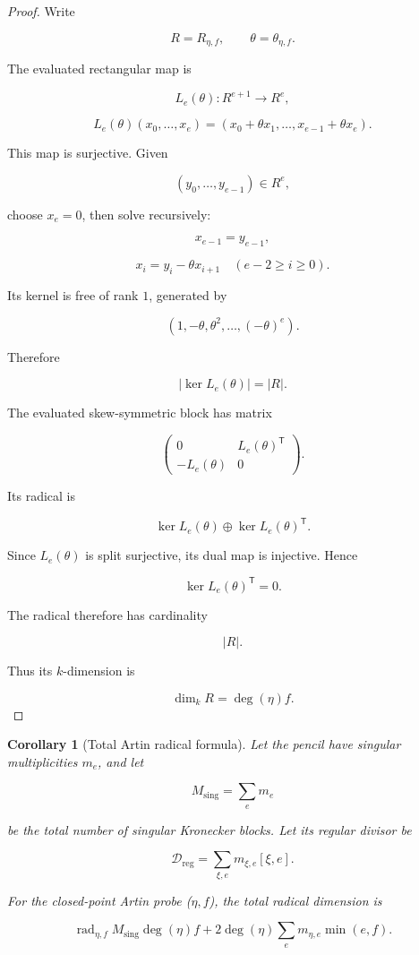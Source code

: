 \documentclass[11pt]{article}
\newtheorem{corollary}[theorem]{Corollary}
\begin{document}
\begin{proof}

Write

\[
R=R_{\eta,f},
\qquad
\theta=\theta_{\eta,f}.
\]

The evaluated rectangular map is

\[
L_e(\theta):R^{e+1}\to R^e,
\]

\[
L_e(\theta)(x_0,\ldots,x_e)
=
(x_0+\theta x_1,\ldots,x_{e-1}+\theta x_e).
\]

This map is surjective. Given

\[
(y_0,\ldots,y_{e-1})\in R^e,
\]

choose $x_e=0$, then solve recursively:

\[
x_{e-1}=y_{e-1},
\]

\[
x_i=y_i-\theta x_{i+1}
\quad
(e-2\ge i\ge0).
\]

Its kernel is free of rank $1$, generated by

\[
(1,-\theta,\theta^2,\ldots,(-\theta)^e).
\]

Therefore

\[
|\ker L_e(\theta)|=|R|.
\]

The evaluated skew-symmetric block has matrix

\[
\begin{pmatrix}
0&L_e(\theta)^{\mathsf T}\\
-L_e(\theta)&0
\end{pmatrix}.
\]

Its radical is

\[
\ker L_e(\theta)\oplus\ker L_e(\theta)^{\mathsf T}.
\]

Since $L_e(\theta)$ is split surjective, its dual map is injective. Hence

\[
\ker L_e(\theta)^{\mathsf T}=0.
\]

The radical therefore has cardinality

\[
|R|.
\]

Thus its $k$-dimension is

\[
\dim_k R
=
\deg(\eta)f.
\]

\end{proof}

\begin{corollary}[Total Artin radical formula]

Let the pencil have singular multiplicities $m_e$, and let

\[
M_{\mathrm{sing}}=\sum_e m_e
\]

be the total number of singular Kronecker blocks. Let its regular divisor be

\[
\mathcal D_{\mathrm{reg}}
=
\sum_{\xi,e}m_{\xi,e}[\xi,e].
\]

For the closed-point Artin probe ($\eta,f$), the total radical dimension is

\[
\boxed{
\operatorname{rad}_{\eta,f}
M_{\mathrm{sing}}\deg(\eta)f
+
2\deg(\eta)\sum_e m_{\eta,e}\min(e,f).
}
\]

\end{corollary}
\end{document}
